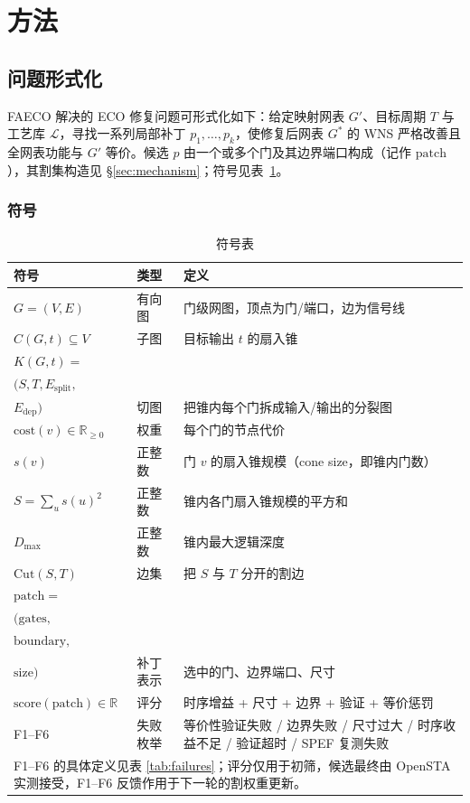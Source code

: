 \documentclass[journal]{IEEEtran}
\begin{document}
\section{方法}

\subsection{问题形式化}
FAECO 解决的 ECO 修复问题可形式化如下：给定映射网表 $G'$、目标周期 $T$ 与工艺库 $\mathcal{L}$，寻找一系列局部补丁 $p_1,\dots,p_k$，使修复后网表 $G^*$ 的 WNS 严格改善且全网表功能与 $G'$ 等价。候选 $p$ 由一个或多个门及其边界端口构成（记作 $\mathrm{patch}$），其割集构造见 \S\ref{sec:mechanism}；符号见表~\ref{tab:symbols}。

\subsubsection{符号}
\begin{table}[!t]
\centering
\caption{符号表}
\label{tab:symbols}
\scriptsize
\setlength{\tabcolsep}{2pt}
\begin{tabular}{p{3.4cm}p{1.5cm}p{3.4cm}}
\toprule
\textbf{符号} & \textbf{类型} & \textbf{定义} \\
\midrule
$G = (V, E)$ & 有向图 & 门级网图，顶点为门/端口，边为信号线 \\
$C(G, t) \subseteq V$ & 子图 & 目标输出 $t$ 的扇入锥 \\
$K(G, t) =$ \\
$(S, T, E_{\mathrm{split}},$ \\
$E_{\mathrm{dep}})$ & 切图 & 把锥内每个门拆成输入/输出的分裂图 \\
$\mathrm{cost}(v) \in \mathbb{R}_{\geq 0}$ & 权重 & 每个门的节点代价 \\
$s(v)$ & 正整数 & 门 $v$ 的扇入锥规模（cone size，即锥内门数）\\
$S = \sum_u s(u)^2$ & 正整数 & 锥内各门扇入锥规模的平方和 \\

$D_{\max}$ & 正整数 & 锥内最大逻辑深度 \\
$\mathrm{Cut}(S, T)$ & 边集 & 把 $S$ 与 $T$ 分开的割边 \\
$\mathrm{patch} =$ \\
$(\mathrm{gates},$ \\
$\mathrm{boundary},$ \\
$\mathrm{size})$ & 补丁表示 & 选中的门、边界端口、尺寸 \\
$\mathrm{score}(\mathrm{patch}) \in \mathbb{R}$ & 评分 & 时序增益 + 尺寸 + 边界 + 验证 + 等价惩罚 \\
F1--F6 & 失败枚举 & 等价性验证失败 / 边界失败 / 尺寸过大 / 时序收益不足 / 验证超时 / SPEF 复测失败 \\
\bottomrule
\multicolumn{3}{p{8.0cm}}{\footnotesize F1--F6 的具体定义见表 \ref{tab:failures}；评分仅用于初筛，候选最终由 OpenSTA 实测接受，F1--F6 反馈作用于下一轮的割权重更新。}\\
\end{tabular}
\end{table}
\end{document}
